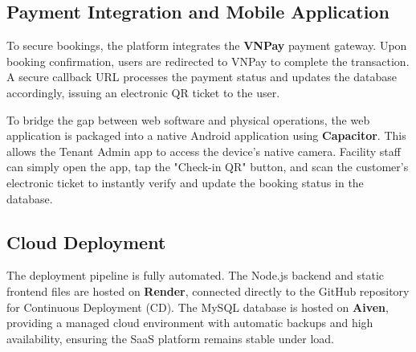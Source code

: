 \subsection{Payment Integration and Mobile Application}

To secure bookings, the platform integrates the \textbf{VNPay} payment gateway. Upon booking confirmation, users are redirected to VNPay to complete the transaction. A secure callback URL processes the payment status and updates the database accordingly, issuing an electronic QR ticket to the user.

To bridge the gap between web software and physical operations, the web application is packaged into a native Android application using \textbf{Capacitor}. This allows the Tenant Admin app to access the device's native camera. Facility staff can simply open the app, tap the "Check-in QR" button, and scan the customer's electronic ticket to instantly verify and update the booking status in the database.

\subsection{Cloud Deployment}

The deployment pipeline is fully automated. The Node.js backend and static frontend files are hosted on \textbf{Render}, connected directly to the GitHub repository for Continuous Deployment (CD). The MySQL database is hosted on \textbf{Aiven}, providing a managed cloud environment with automatic backups and high availability, ensuring the SaaS platform remains stable under load.